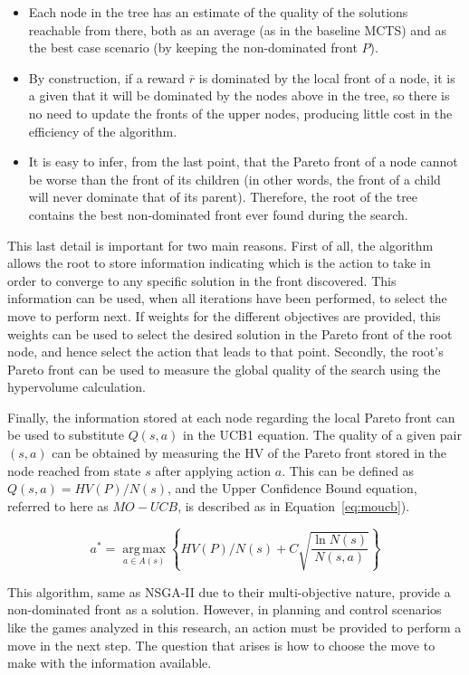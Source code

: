 \documentclass[journal]{IEEEtran}
\newcommand{\argmax}{\operatorname*{arg\,max}}
\begin{document}
\begin{itemize}
\item Each node in the tree has an estimate of the quality of the solutions reachable from there, both as an average (as in the baseline MCTS) and as the best case scenario (by keeping the non-dominated front $P$).
\item By construction, if a reward $\overline{r}$ is dominated by the local front of a node, it is a given that it will be dominated by the nodes above in the tree, so there is no need to update the fronts of the upper nodes, producing little cost in the efficiency of the algorithm.
\item It is easy to infer, from the last point, that the Pareto front of a node cannot be worse than the front of its children (in other words, the front of a child will never dominate that of its parent). Therefore, the root of the tree contains the best non-dominated front ever found during the search.
\end{itemize}

This last detail is important for two main reasons. First of all, the algorithm allows the root to store information indicating which is the action to take in order to converge to any specific solution in the front discovered. This information can be used, when all iterations have been performed, to select the move to perform next. If weights for the different objectives are provided, this weights can be used to select the desired solution in the Pareto front of the root node, and hence select the action that leads to that point. Secondly, the root's Pareto front can be used to measure the global quality of the search using the hypervolume calculation.

Finally, the information stored at each node regarding the local Pareto front can be used to substitute $Q(s,a)$ in the UCB1 equation. The quality of a given pair $(s,a)$ can be obtained by measuring the HV of the Pareto front stored in the node reached from state $s$ after applying action $a$. This can be defined as  $Q(s,a) = HV(P)/N(s)$, and the Upper Confidence Bound equation, referred to here as $MO-UCB$, is described as in Equation~\ref{eq:moucb}). 

\begin{equation}	\label{eq:moucb}
a^* = \argmax_{a \in A(s)} \left\{HV(P)/N(s) + C \sqrt{\frac{ \ln N(s) }{ N(s,a) }}\right\}
\end{equation}

This algorithm, same as NSGA-II due to their multi-objective nature, provide a non-dominated front as a solution. However, in planning and control scenarios like the games analyzed in this research, an action must be provided to perform a move in the next step. The question that arises is how to choose the move to make with the information available.
\end{document}
